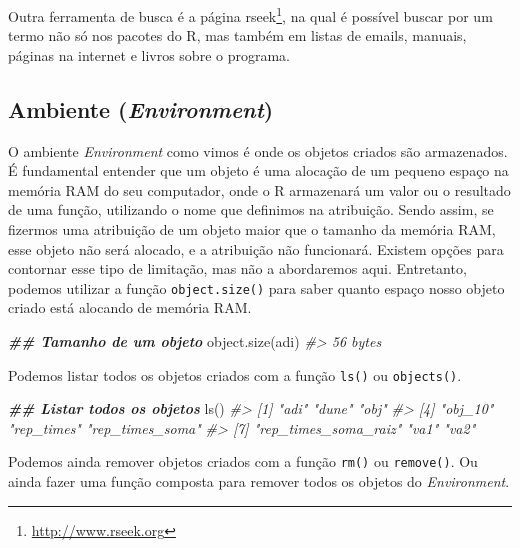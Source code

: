 \documentclass[
]{book}
\newenvironment{Shaded}{\begin{snugshade}}{\end{snugshade}}
\newcommand{\CommentTok}[1]{\textcolor[rgb]{0.37,0.37,0.37}{\textit{#1}}}
\newcommand{\DocumentationTok}[1]{\textcolor[rgb]{0.37,0.37,0.37}{\textbf{\textit{#1}}}}
\newcommand{\FunctionTok}[1]{\textcolor[rgb]{0,0,0}{#1}}
\newcommand{\NormalTok}[1]{#1}
\renewcommand{\href}[2]{#2\footnote{\url{#1}}}
\begin{document}
Outra ferramenta de busca é a página \href{http://www.rseek.org}{rseek}, na qual é possível buscar por um termo não só nos pacotes do R, mas também em listas de emails, manuais, páginas na internet e livros sobre o programa.

\hypertarget{ambiente-environment}{%
\subsection{\texorpdfstring{Ambiente (\emph{Environment})}{Ambiente (Environment)}}\label{ambiente-environment}}

O ambiente \emph{Environment} como vimos é onde os objetos criados são armazenados. É fundamental entender que um objeto é uma alocação de um pequeno espaço na memória RAM do seu computador, onde o R armazenará um valor ou o resultado de uma função, utilizando o nome que definimos na atribuição. Sendo assim, se fizermos uma atribuição de um objeto maior que o tamanho da memória RAM, esse objeto não será alocado, e a atribuição não funcionará. Existem opções para contornar esse tipo de limitação, mas não a abordaremos aqui. Entretanto, podemos utilizar a função \texttt{object.size()} para saber quanto espaço nosso objeto criado está alocando de memória RAM.

\begin{Shaded}
\begin{Highlighting}[]
\DocumentationTok{\#\# Tamanho de um objeto}
\FunctionTok{object.size}\NormalTok{(adi)}
\CommentTok{\#\textgreater{} 56 bytes}
\end{Highlighting}
\end{Shaded}

Podemos listar todos os objetos criados com a função \texttt{ls()} ou \texttt{objects()}.

\begin{Shaded}
\begin{Highlighting}[]
\DocumentationTok{\#\# Listar todos os objetos}
\FunctionTok{ls}\NormalTok{()}
\CommentTok{\#\textgreater{} [1] "adi"                 "dune"                "obj"                }
\CommentTok{\#\textgreater{} [4] "obj\_10"              "rep\_times"           "rep\_times\_soma"     }
\CommentTok{\#\textgreater{} [7] "rep\_times\_soma\_raiz" "va1"                 "va2"}
\end{Highlighting}
\end{Shaded}

Podemos ainda remover objetos criados com a função \texttt{rm()} ou \texttt{remove()}. Ou ainda fazer uma função composta para remover todos os objetos do \emph{Environment}.
\end{document}
